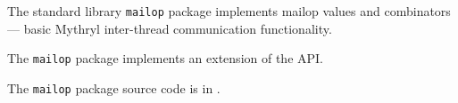 
The standard library {\tt mailop} package implements mailop values and combinators --- basic Mythryl inter-thread communication functionality.

The {\tt mailop} package implements an extension of the  API.

The {\tt mailop} package source code is in .
